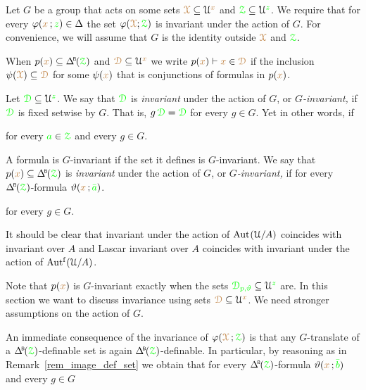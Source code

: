 \begin{assumption}\label{notation_GXphi}
  Let $G$ be a group that acts on some sets ${{\color{brown}\EuScript X}}\subseteq\EuScript U^{\color{brown} x}$ and ${{\color{green}\EuScript Z}}\subseteq\EuScript U^{\color{green} z}$.
  We require that for every $\varphi({\color{brown} x}\,;{\color{green} z})\in\Delta$ the set $\varphi({\color{brown}\EuScript X};{\color{green}\EuScript Z})$ is invariant under the action of $G$.
  For convenience, we will assume that $G$ is the identity outside ${{\color{brown}\EuScript X}}$ and ${{\color{green}\EuScript Z}}$.

  When $p({\mr x})\subseteq\BDelta(\grZ)$ and  ${{\color{brown}\EuScript D}}\subseteq\EuScript U^{\color{brown} x}$ we write $p({\color{brown} x})\vdash{\color{brown}x}\in{{\color{brown}\EuScript D}}$ if the inclusion $\psi({\color{brown}\EuScript X})\subseteq{{\color{brown}\EuScript D}}$ for some $\psi({\color{brown} x})$ that is conjunctions of formulas in $p({\color{brown} x})$.
\end{assumption}

Let ${\color{green}\EuScript D}\subseteq\EuScript U^{\color{green} z}$.
We say that ${\color{green}\EuScript D}$ is \emph{invariant\/} under the action of $G$, or \emph{$G$-invariant,} if  ${\color{green}\EuScript D}$ is fixed setwise by $G$.
That is, $g\,{\color{green}\EuScript D}={\color{green}\EuScript D}$ for every $g\in G$.
Yet in other words, if

\hfill for every ${\color{green} a}\in{\color{green}\EuScript Z}$ and every $g\in G$.

A formula is $G$-invariant if the set it defines is $G$-invariant.
We say that $p({\mr x})\subseteq\BDelta(\grZ)$ is \emph{invariant\/} under the action of $G$, or \emph{$G$-invariant,} if for every $\BDelta(\grZ)$-formula $\vartheta({\color{brown} x}\,;{\color{green}\bar a})$. 

\hfill for every $g\in G$.

It should be clear that invariant under the action of ${\rm Aut\kern.15ex}(\EuScript U/A)$ coincides with invariant over $A$ and Lascar invariant over $A$ coincides with invariant under the action of $\mbox{Aut$^{\rm f}$}(\EuScript U/A)$.

Note that $p({\color{brown} x})$ is $G$-invariant exactly when the sets ${\color{green}\EuScript D_{p,\vartheta}}\subseteq\EuScript U^{\color{green} z}$ are.
In this section we want to discuss invariance using sets ${\color{brown}\EuScript D}\subseteq\EuScript U^{\color{brown} x}$.
We need stronger assumptions on the action of $G$.

An immediate consequence of the invariance of $\varphi({\color{brown}\EuScript X}\,;{\color{green}\EuScript Z})$ is that any $G$-translate of a $\BDelta({\grZ})$-definable set is again $\BDelta({\grZ})$-definable.
In particular, by reasoning as in Remark~\ref{rem_image_def_set} we obtain that for every $\BDelta({\grZ})$-formula $\vartheta({\color{brown} x}\,;{\color{green}\bar b})$ and every $g\in G$


